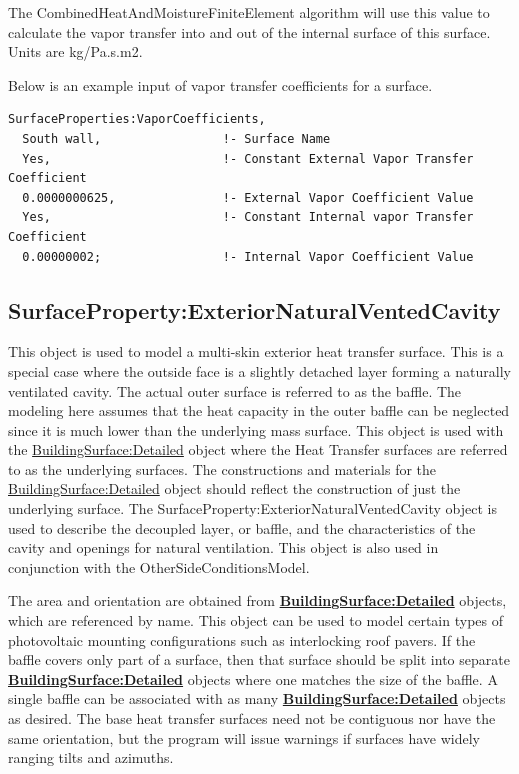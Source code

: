 The CombinedHeatAndMoistureFiniteElement algorithm will use this value to calculate the vapor transfer into and out of the internal surface of this surface. Units are kg/Pa.s.m2.

Below is an example input of vapor transfer coefficients for a surface.

\begin{lstlisting}
SurfaceProperties:VaporCoefficients,
  South wall,                 !- Surface Name
  Yes,                        !- Constant External Vapor Transfer Coefficient
  0.0000000625,               !- External Vapor Coefficient Value
  Yes,                        !- Constant Internal vapor Transfer Coefficient
  0.00000002;                 !- Internal Vapor Coefficient Value
\end{lstlisting}

\subsection{SurfaceProperty:ExteriorNaturalVentedCavity}\label{surfacepropertyexteriornaturalventedcavity}

This object is used to model a multi-skin exterior heat transfer surface. This is a special case where the outside face is a slightly detached layer forming a naturally ventilated cavity. The actual outer surface is referred to as the baffle. The modeling here assumes that the heat capacity in the outer baffle can be neglected since it is much lower than the underlying mass surface. This object is used with the \hyperref[buildingsurfacedetailed]{BuildingSurface:Detailed} object where the Heat Transfer surfaces are referred to as the underlying surfaces. The constructions and materials for the \hyperref[buildingsurfacedetailed]{BuildingSurface:Detailed} object should reflect the construction of just the underlying surface. The SurfaceProperty:ExteriorNaturalVentedCavity object is used to describe the decoupled layer, or baffle, and the characteristics of the cavity and openings for natural ventilation. This object is also used in conjunction with the OtherSideConditionsModel.

The area and orientation are obtained from \textbf{\hyperref[buildingsurfacedetailed]{BuildingSurface:Detailed}} objects, which are referenced by name. This object can be used to model certain types of photovoltaic mounting configurations such as interlocking roof pavers. If the baffle covers only part of a surface, then that surface should be split into separate \textbf{\hyperref[buildingsurfacedetailed]{BuildingSurface:Detailed}} objects where one matches the size of the baffle. A single baffle can be associated with as many \textbf{\hyperref[buildingsurfacedetailed]{BuildingSurface:Detailed}} objects as desired. The base heat transfer surfaces need not be contiguous nor have the same orientation, but the program will issue warnings if surfaces have widely ranging tilts and azimuths.

